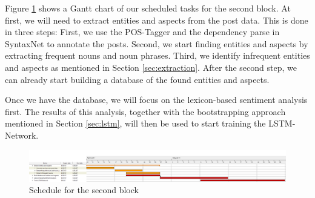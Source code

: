\documentclass[10pt,a4paper]{article}
\begin{document}
	Figure \ref{fig:gantt} shows a Gantt chart of our scheduled tasks for the second block. At first, we will need to extract entities and aspects from the post data. This is done in three steps: First, we use the POS-Tagger and the dependency parse in SyntaxNet to annotate the posts. Second, we start finding entities and aspects by extracting frequent nouns and noun phrases. Third, we identify infrequent entities and aspects as mentioned in Section \ref{sec:extraction}. After the second step, we can already start building a database of the found entities and aspects.
	
	Once we have the database, we will focus on the lexicon-based sentiment analysis first. The results of this analysis, together with the bootstrapping approach mentioned in Section \ref{sec:lstm}, will then be used to start training the LSTM-Network.
	
	\begin{figure}[h]
		\centering
		\includegraphics[width=\linewidth]{data/gantt}
		\caption{Schedule for the second block}
		\label{fig:gantt}
	\end{figure}

	\newpage
	
	\nocite{Zhang2014}
	\nocite{syntaxnet}

	
	
\end{document}
